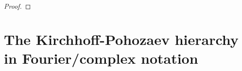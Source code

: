 \documentclass[reqno,11pt]{amsart}
\theoremstyle{plain}
\numberwithin{equation}{section}
\newcommand{\N}{\mathbb{N}}
\newcommand{\Z}{\mathbb{Z}}
\renewcommand{\H}{\mathcal{H}}
\newcommand{\I}{{\texttt{\bf J}}}
\newcommand{\cI}{{\mathcal I}}
\newcommand{\red}[1]{\textcolor{red}{#1}}
\begin{document}
{\begin{proof}
\end{proof}
\section{The Kirchhoff-Pohozaev hierarchy in Fourier/complex notation}\label{complessi}




}
\end{document}
